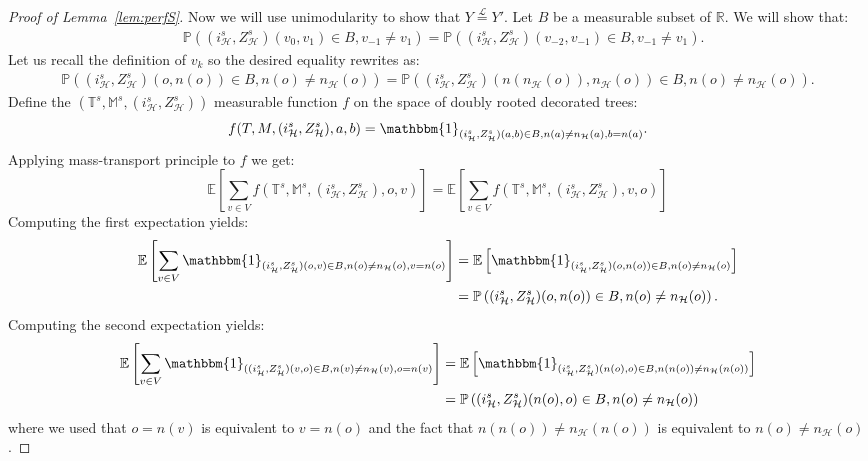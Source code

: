 \documentclass[11pt]{article}
\begin{document}
\begin{proof}[Proof of Lemma~\ref{lem:perfS}]
Now we will use unimodularity to show that $Y \overset{\mathcal{L}}{=}Y'$.
Let $B$ be a measurable subset of $\mathbb{R}$. We will show that:
\begin{align*}
    &\mathbb{P}\left( (i^s_{\mathcal{H}},Z^s_{\mathcal{H}})(v_{0},v_{1}) \in B, v_{-1} \neq v_1 \right)=\mathbb{P}\left( (i^s_{\mathcal{H}},Z^s_{\mathcal{H}})(v_{-2},v_{-1}) \in B, v_{-1} \neq v_1 \right).
\end{align*}
Let us recall the definition of $v_k$ so the desired equality rewrites as:
\begin{align}\label{eq:lemmeoptimal}
\mathbb{P}\left((i^s_{\mathcal{H}},Z^s_{\mathcal{H}})(o,n(o)) \in B, n(o)\neq n_{\mathcal{H}}(o) \right) = \mathbb{P}\left(  (i^s_{\mathcal{H}},Z^s_{\mathcal{H}})(n(n_{\mathcal{H}}(o)),n_{\mathcal{H}}(o)) \in B, n(o) \neq n_{\mathcal{H}}(o) \right).
\end{align}
Define the $(\mathbb{T}^s,\mathbb{M}^s,(i^s_{\mathcal{H}},Z^s_{\mathcal{H}}))$ measurable function $f$ on the space of doubly rooted  decorated trees:
\[f(T,M,(i^s_{\mathcal{H}},Z^s_{\mathcal{H}}),a,b)=\mathbbm{1}_{ (i^s_{\mathcal{H}},Z^s_{\mathcal{H}})(a,b)\in B, n(a)\neq n_{\mathcal{H}}(a), b=n(a)   } .  \]
Applying mass-transport principle to $f$ we get:
\[ \mathbb{E} \left[  \sum_{v\in V} f(\mathbb{T}^s,\mathbb{M}^s,(i^s_{\mathcal{H}},Z^s_{\mathcal{H}}),o,v) \right] = \mathbb{E} \left[  \sum_{v\in V} f(\mathbb{T}^s,\mathbb{M}^s,(i^s_{\mathcal{H}},Z^s_{\mathcal{H}}),v,o) \right]  \]
Computing the first expectation yields:
\begin{align*}
\mathbb{E}\left[ \sum_{v\in V}\mathbbm{1}_{(i^s_{\mathcal{H}},Z^s_{\mathcal{H}})(o,v) \in B, n(o) \neq n_{\mathcal{H}}(o), v=n(o)}  \right] 
&= \mathbb{E}\left[ \mathbbm{1}_{(i^s_{\mathcal{H}},Z^s_{\mathcal{H}})(o,n(o)) \in B, n(o) \neq n_{\mathcal{H}}(o)} \right] \\
&= \mathbb{P}\left( (i^s_{\mathcal{H}},Z^s_{\mathcal{H}})(o,n(o)) \in B, n(o) \neq n_{\mathcal{H}}(o)  \right) .
 \end{align*}
 Computing the second expectation yields:
\begin{align*}
\mathbb{E}\left[ \sum_{v\in V}\mathbbm{1}_{((i^s_{\mathcal{H}},Z^s_{\mathcal{H}})(v,o) \in B, n(v) \neq n_{\mathcal{H}}(v), o=n(v)}  \right]  
&= \mathbb{E}\left[ \mathbbm{1}_{(i^s_{\mathcal{H}},Z^s_{\mathcal{H}})(n(o),o) \in B,  n(n(o)) \neq n_{\mathcal{H}}(n(o))} \right] \\
 &= \mathbb{P}\left( (i^s_{\mathcal{H}},Z^s_{\mathcal{H}})(n(o),o) \in B , n(o) \neq n_{\mathcal{H}}(o)  \right) 
 \end{align*}
where we used that $o=n(v)$ is equivalent to $v=n(o)$ and the fact that $n(n(o))\neq n_{\mathcal{H}}(n(o))$ is equivalent to $n(o) \neq n_{\mathcal{H}}(o)$. 



\end{proof}
\end{document}
